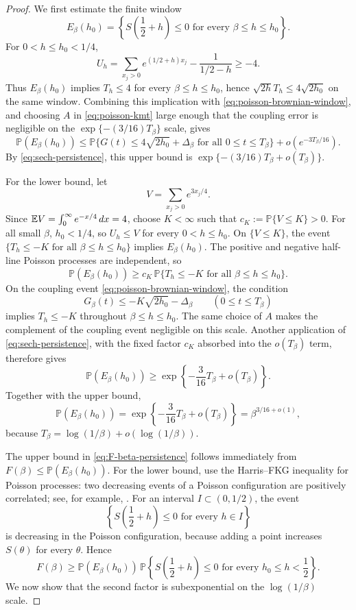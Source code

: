 \begin{proof}
We first estimate the finite window
\[
    E_\beta(h_0)
    =
    \left\{
        S\left(\frac12+h\right)\le0
        \text{ for every }\beta\le h\le h_0
    \right\}.
\]
For $0<h\le h_0<1/4$,
\[
    U_h
    =
    \sum_{x_j>0}e^{(1/2+h)x_j}
    -
    \frac{1}{1/2-h}
    \ge
    -4.
\]
Thus $E_\beta(h_0)$ implies $T_h\le4$ for every $\beta\le h\le h_0$, hence $\sqrt{2h}T_h\le4\sqrt{2h_0}$ on the same window. Combining this implication with \eqref{eq:poisson-brownian-window}, and choosing $A$ in \eqref{eq:poisson-kmt} large enough that the coupling error is negligible on the $\exp\{-(3/16)T_\beta\}$ scale, gives
\[
    \mathbb P(E_\beta(h_0))
    \le
    \mathbb P\{G(t)\le4\sqrt{2h_0}+\Delta_\beta\text{ for all }0\le t\le T_\beta\}
    +o\!\left(e^{-3T_\beta/16}\right).
\]
By \eqref{eq:sech-persistence}, this upper bound is $\exp\{-(3/16)T_\beta+o(T_\beta)\}$.

For the lower bound, let
\[
    V=\sum_{x_j>0} e^{3x_j/4}.
\]
Since $\mathbb{E} V=\int_0^\infty e^{-x/4}\,dx=4$, choose $K<\infty$ such that $c_K:=\mathbb P\{V\le K\}>0$. For all small $\beta$, $h_0<1/4$, so $U_h\le V$ for every $0<h\le h_0$. On $\{V\le K\}$, the event $\{T_h\le -K\text{ for all }\beta\le h\le h_0\}$ implies $E_\beta(h_0)$. The positive and negative half-line Poisson processes are independent, so
\[
    \mathbb P(E_\beta(h_0))
    \ge
    c_K\,
    \mathbb P\{T_h\le -K\text{ for all }\beta\le h\le h_0\}.
\]
On the coupling event \eqref{eq:poisson-brownian-window}, the condition
\[
    G_\beta(t)\le -K\sqrt{2h_0}-\Delta_\beta
    \qquad(0\le t\le T_\beta)
\]
implies $T_h\le -K$ throughout $\beta\le h\le h_0$. The same choice of $A$ makes the complement of the coupling event negligible on this scale. Another application of \eqref{eq:sech-persistence}, with the fixed factor $c_K$ absorbed into the $o(T_\beta)$ term, therefore gives
\[
    \mathbb P(E_\beta(h_0))
    \ge
    \exp\!\left\{-\frac{3}{16}T_\beta+o(T_\beta)\right\}.
\]
Together with the upper bound,
\begin{equation}
\label{eq:finite-window-persistence}
    \mathbb P(E_\beta(h_0))
    =
    \exp\!\left\{-\frac{3}{16}T_\beta+o(T_\beta)\right\}
    =
    \beta^{3/16+o(1)},
\end{equation}
because $T_\beta=\log(1/\beta)+o(\log(1/\beta))$.

The upper bound in \eqref{eq:F-beta-persistence} follows immediately from $F(\beta)\le\mathbb P(E_\beta(h_0))$. For the lower bound, use the Harris--FKG inequality for Poisson processes: two decreasing events of a Poisson configuration are positively correlated; see, for example, \cite[Theorem~20.4]{kallenberg2017random}. For an interval $I\subset(0,1/2)$, the event
\[
    \left\{
        S\left(\frac12+h\right)\le0
        \text{ for every }h\in I
    \right\}
\]
is decreasing in the Poisson configuration, because adding a point increases $S(\theta)$ for every $\theta$. Hence
\[
    F(\beta)
    \ge
    \mathbb P(E_\beta(h_0))\,
    \mathbb P\left\{
        S\left(\frac12+h\right)\le0
        \text{ for every }h_0\le h<\frac12
    \right\}.
\]
We now show that the second factor is subexponential on the
$\log(1/\beta)$ scale.


\end{proof}
